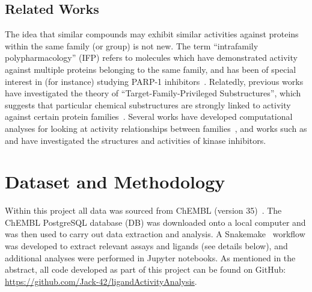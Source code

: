 \documentclass[11pt]{article}
\begin{document}
\subsection{Related Works}
The idea that similar compounds may exhibit similar activities against proteins within the same family (or group) is not new. 
The term ``intrafamily polypharmacology'' (IFP) refers to molecules which have demonstrated activity against multiple proteins belonging to the same family, and has been of special interest in (for instance) studying PARP-1 inhibitors~\cite{passeri_camaioni_liscio_sabbatini_ferri_carotti_giacchè_pellicciari_gioiello_macchiarulo_2015, antolin_ameratunga_banerji_clarke_workman_al-lazikani_2020}. 
Relatedly, previous works have investigated the theory of ``Target-Family-Privileged Substructures'', which suggests that particular chemical substructures are strongly linked to activity against certain protein families~\cite{schnur_hermsmeier_tebben_2006}. 
Several works have developed computational analyses for looking at activity relationships between families~\cite{bajorath_2008}, and works such as \cite{filip_miljkovic_jurgen_bajorath_2018} and \cite{lo_liu_morrissey_kakiuchi-kiyota_johnson_broccatelli_zhong_joshi_altman_2018} have investigated the structures and activities of kinase inhibitors. 


\section{Dataset and Methodology}\label{sec:methodology}
Within this project all data was sourced from ChEMBL (version 35)~\cite{chembl_db_2023}. 
The ChEMBL PostgreSQL database (DB) was downloaded onto a local computer and was then used to carry out data extraction and analysis. 
A Snakemake~\cite{snakemake_2021} workflow was developed to extract relevant assays and ligands (see details below), and additional analyses were performed in Jupyter notebooks. 
As mentioned in the abstract, all code developed as part of this project can be found on GitHub: \href{https://github.com/Jack-42/ligandActivityAnalysis}{https://github.com/Jack-42/ligandActivityAnalysis}. 
\end{document}
